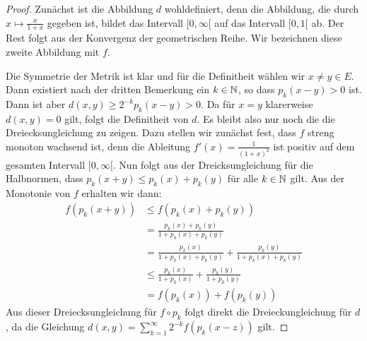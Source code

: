 \begin{proof}
  Zunächst ist die Abbildung $d$ wohldefiniert, denn die Abbildung,
  die durch $x \mapsto \frac{x}{1+x}$ gegeben ist, bildet das
  Intervall $[0, \infty[$ auf das Intervall $[0,1[$ ab. Der Rest folgt
  aus der Konvergenz der geometrischen Reihe. Wir bezeichnen
  diese zweite Abbildung mit $f$.

  Die Symmetrie der Metrik ist klar und für die Definitheit wählen wir
  $x\neq y \in E$. Dann existiert nach der dritten Bemerkung ein $k \in
  \mathbb{N}$, so dass $p_k(x-y) >0$ ist. Dann ist aber $d(x,y) \geq
  2^{-k}p_k(x-y) > 0$. Da für $x =y$ klarerweise $d(x,y) =0$ gilt,
  folgt die Definitheit von $d$. Es bleibt also nur noch die die
  Dreiecksungleichung zu zeigen. Dazu stellen wir zunächst fest, dass
  $f$ streng monoton wachsend ist, denn die Ableitung $f'(x) =
  \frac{1}{(1+x)^2}$ ist positiv auf dem gesamten Intervall $[0,
  \infty[$. Nun folgt aus der Dreicksungleichung für die Halbnormen,
  dass $p_k(x+y) \leq p_k(x) + p_k(y)$ für alle $k \in \mathbb{N}$ gilt. Aus
  der Monotonie von $f$ erhalten wir dann:
  \begin{align*}
    f(p_k(x+y)) & \leq f(p_k(x) + p_k(y)) \\
    & = \frac{ p_k(x) + p_k(y)}{1 + p_k(x) + p_k(y)}\\
    & = \frac{p_k(x)}{1+ p_k(x)+p_k(y)} + \frac{p_k(y)}{1+p_k(x) +
      p_k(y)} \\
    & \leq \frac{p_k(x)}{1+p_k(x)} + \frac{p_k(y)}{1+ p_k(y)} \\
    & = f(p_k(x)) + f(p_k(y))
  \end{align*}
  Aus dieser Dreiecksungleichung für $f \circ p_k$ folgt direkt die
  Dreieckungleichung für $d$, da die Gleichung $d(x,y) = \sum_{k=1}^\infty
  2^{-k}f(p_k(x-z))$ gilt.
  

\end{proof}
